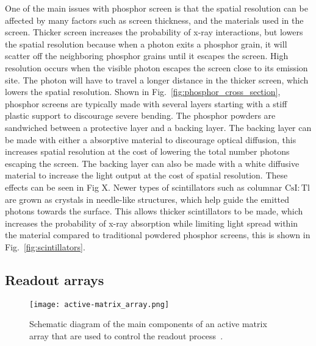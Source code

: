 One of the main issues with phosphor screen is that the spatial resolution can be affected by many factors such as screen thickness, and the materials used in the screen.  Thicker screen increases the probability of x-ray interactions, but lowers the spatial resolution because when a photon exits a phosphor grain, it will scatter off the neighboring phosphor grains until it escapes the screen.  High resolution occurs when the visible photon escapes the screen close to its emission site.  The photon will have to travel a longer distance in the thicker screen, which lowers the spatial resolution.  Shown in Fig.~\ref{fig:phosphor_cross_section}, phosphor screens are typically made with several layers starting with a stiff plastic support to discourage severe bending.  The phosphor powders are sandwiched between a protective layer and a backing layer.  The backing layer can be made with either a absorptive material to discourage optical diffusion, this increases spatial resolution at the cost of lowering the total number photons escaping the screen.  The backing layer can also be made with a white diffusive material to increase the light output at the cost of spatial resolution.  These effects can be seen in Fig X.  Newer types of scintillators such as columnar $\mathrm{CsI:Tl}$ are grown as crystals in needle-like structures, which help guide the emitted photons towards the surface.  This allows thicker scintillators to be made, which increases the probability of x-ray absorption while limiting light spread within the material compared to traditional powdered phosphor screens, this is shown in Fig.~\ref{fig:scintillators}.

\subsection{Readout arrays}

\begin{figure}[h]
\texttt{[image: active-matrix\_array.png]}
\caption{Schematic diagram of the main components of an active matrix array that are used to control the readout process~\citep{Fahrig2008}.}
\label{fig:schematic_active-matrix_array}
\end{figure}

